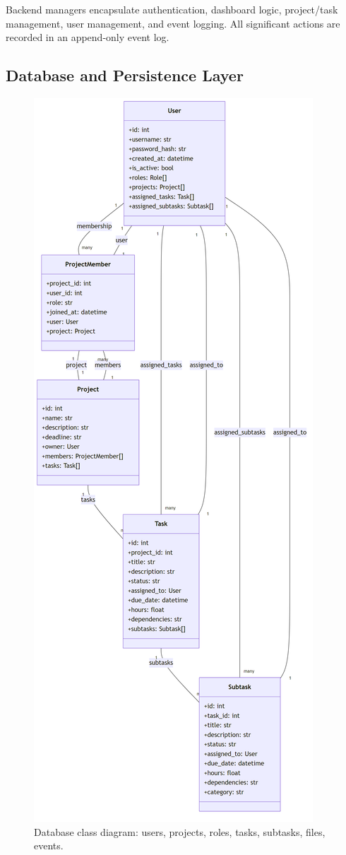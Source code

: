 \documentclass{report}
\begin{document}
Backend managers encapsulate authentication, dashboard logic, project/task management, user management, and event logging. All significant actions are recorded in an append-only event log.

\subsection*{Database and Persistence Layer}
\begin{figure}
\centering
\includegraphics[width=\linewidth,height=0.9\textheight,keepaspectratio]{png_files/db_class_diagram.png}
\caption{Database class diagram: users, projects, roles, tasks, subtasks, files, events.}
\end{figure}
\end{document}
